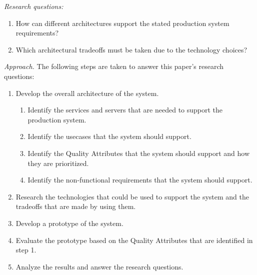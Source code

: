 \emph{Research questions:}
\vspace{1mm}
\begin{enumerate}
    \item How can different architectures support the stated production system requirements?
    \item Which architectural tradeoffs must be taken due to the technology choices?
\end{enumerate}
\vspace{4mm}

\emph{Approach.}
The following steps are taken to answer this paper's research questions:
\vspace{1mm}
\begin{enumerate}
    \item Develop the overall architecture of the system.
          \begin{enumerate}
              \item Identify the services and servers that are needed to support the production system.
              \item Identify the usecases that the system should support.
              \item Identify the Quality Attributes that the system should support and how they are prioritized.
              \item Identify the non-functional requirements that the system should support.
          \end{enumerate}
    \item Research the technologies that could be used to support the system and the tradeoffs that are made by using them.
    \item Develop a prototype of the system.
    \item Evaluate the prototype based on the Quality Attributes that are identified in step 1.
    \item Analyze the results and answer the research questions.
\end{enumerate}

